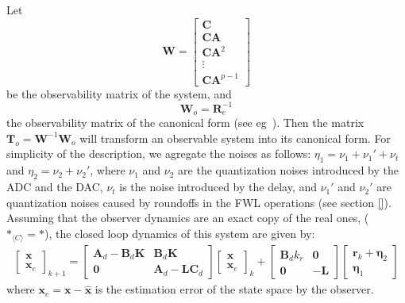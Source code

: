\documentclass[sigconf]{llncs}
\newcommand{\mat}[1]{\boldsymbol{#1}}
\renewcommand{\vec}[1]{\boldsymbol{#1}}
\begin{document}
Let 
\begin{equation}
\label{eq:wnof}
\mat{W}=\left[\begin{array}{c}\mat{C}\\ \mat{C}\mat{A}\\ \mat{C}\mat{A}^2\\ \vdots\\ \mat{C}\mat{A}^{p-1}\end{array}\right]
\end{equation}
be the observability matrix of the system, and
\begin{equation}
\label{eq:wof}
\mat{W}_{o}=\mat{R}_{c}^{-1}
\end{equation}
the observability matrix of the canonical form (see eg~\cite{Astrom08}). Then the matrix $\mat{T}_o=\mat{W}^{-1}\mat{W}_{o}$ will transform an observable system into its canonical form.
For simplicity of the description, we agregate the noises as follows:
$\eta_1=\nu_1+\nu_1'+\nu_t$ and $\eta_2=\nu_2+\nu_2'$,
where $\nu_1$ and $\nu_2$ are the quantization noises introduced by the ADC and the DAC, $\nu_t$ is the noise introduced by the delay, and $\nu_1'$ and $\nu_2'$ are quantization noises caused by roundoffs in the FWL operations (see section \ref{}).
Assuming that the observer dynamics are an exact copy of the real ones, ($\mat{*}_{\langle C \rangle}=\mat{*}$), the closed loop dynamics of this system are given by:
\begin{align}
\left [\begin{array}{c}\vec{x}\\ \vec{x}_e \end{array}\right]_{k+1}
=\left [\begin{array}{cc}\mat{A}_d-\mat{B}_d\mat{K}&\mat{B}_d\mat{K}\\ \mat{0}&\mat{A}_d-\mat{L}\mat{C}_d\end{array}\right]
\left [\begin{array}{c}\vec{x}\\ \vec{x}_e \end{array}\right]_k
+\left [\begin{array}{cc}\mat{B}_dk_r&\mat{0}\\ \mat{0}&-\mat{L}\end{array}\right]\left [\begin{array}{c}\vec{r}_k+\vec{\eta}_2\\ \vec{\eta}_1\end{array}\right]
\label{eq:observer_LTI}
\end{align}
where $\vec{x}_e=\vec{x}-\hat{\vec{x}}$ is the estimation error of the state space by the observer.
\end{document}
